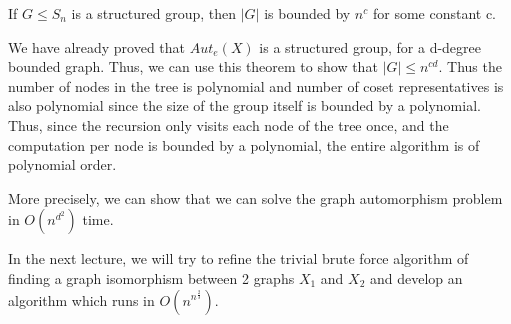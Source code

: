 \begin{theorem}
If $G \leqslant S_{n}$ is a structured group, then $|G|$ is bounded by $n^{c}$  for some constant c.
\end{theorem}

We have already proved that $Aut_{e}(X)$ is a structured group, for a d-degree bounded graph. Thus, we can use this theorem to show that $|G| \leq n^{cd}$. Thus the number of nodes in the tree is polynomial and number of coset representatives is also polynomial since the size of the group itself is bounded by a polynomial. Thus, since the recursion only visits each node of the tree once, and the computation per node is bounded by a polynomial, the entire algorithm is of polynomial order.

More precisely, we can show that we can solve the graph automorphism problem in $O(n^{d^{2}})$ time.

In the next lecture, we will try to refine the trivial brute force algorithm of finding a graph isomorphism between 2 graphs $X_{1}$ and $X_{2}$ and develop an algorithm which runs in $O(n^{n^{\frac{2}{3}}})$.


